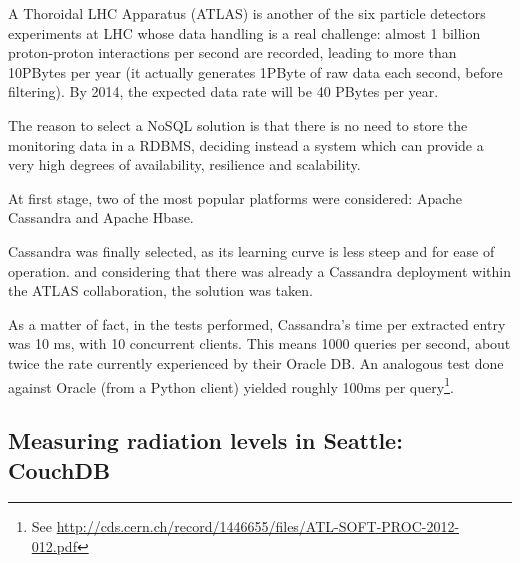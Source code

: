 A Thoroidal LHC Apparatus (ATLAS) is another of the six particle detectors experiments
at LHC %
whose data handling is a real challenge: almost 1 billion
proton-proton
interactions per second
are recorded,
leading to more than 10PBytes per year (it actually generates 1PByte of raw data each second, before filtering). By 2014, the expected data rate will be 40 PBytes per year.


The reason to select a NoSQL solution is
that
there is no need to store the monitoring data in a RDBMS, deciding instead a system which can provide a very high degrees of availability, resilience and scalability.

At first stage, two of the most popular platforms were considered: Apache
Cassandra
and Apache Hbase.

Cassandra was finally selected, as its learning curve is less steep %
and for ease of operation.
and considering that
there was %
already
a Cassandra deployment within the ATLAS collaboration,
the solution was taken.

As a matter of fact, in the tests
performed, %
Cassandra's time per extracted entry was 10 ms, with 10 concurrent clients. This means 1000 queries per second, about twice the rate currently experienced by their Oracle DB. An analogous test done against Oracle (from a Python client) yielded roughly 100ms per
query\footnote{See \url{http://cds.cern.ch/record/1446655/files/ATL-SOFT-PROC-2012-012.pdf}}.


\subsection{Measuring radiation levels in Seattle: CouchDB} %
\label{sec:measuring_radiation_levels_in_seattle_couchdb}

